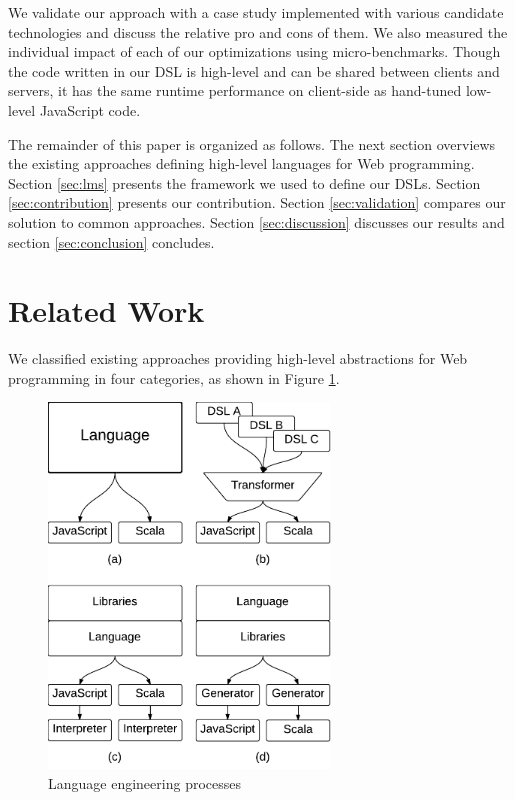 \documentclass{llncs}
\begin{document}
We validate our approach with a case study implemented with various candidate technologies and
discuss the relative pro and cons of them. We also measured the individual impact of each of our optimizations using micro-benchmarks. Though the code written in our DSL is high-level and can
be shared between clients and servers, it has the same runtime performance on client-side as
hand-tuned low-level JavaScript code.

The remainder of this paper is organized as follows. The next section overviews the
existing approaches defining high-level languages for Web programming. Section \ref{sec:lms}
presents the framework we used to define our DSLs. Section \ref{sec:contribution} presents our
contribution. Section \ref{sec:validation} compares our solution to common approaches. Section
\ref{sec:discussion} discusses our results and section \ref{sec:conclusion} concludes.

\section{Related Work}
\label{sec:related-work}



We classified existing approaches providing high-level abstractions for Web programming in four
categories, as shown in Figure \ref{fig:langs}.

\begin{figure}[htb]
\begin{center}
\includegraphics[width=7.5cm]{gpce19c-foy-langs.pdf}
\end{center}
\caption{Language engineering processes}
\vspace{-0.5cm}
\label{fig:langs}
\end{figure}
\end{document}
